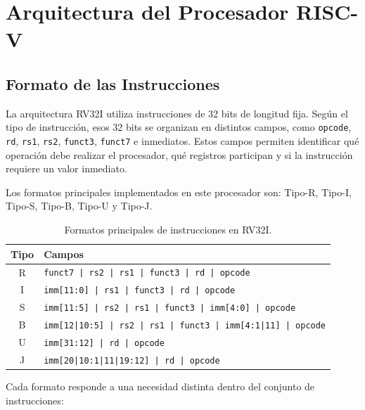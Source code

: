 \section{Arquitectura del Procesador RISC-V}

\subsection{Formato de las Instrucciones}
La arquitectura RV32I utiliza instrucciones de 32 bits de longitud fija. Según el tipo de instrucción, esos 32 bits se organizan en distintos campos, como \texttt{opcode}, \texttt{rd}, \texttt{rs1}, \texttt{rs2}, \texttt{funct3}, \texttt{funct7} e inmediatos. Estos campos permiten identificar qué operación debe realizar el procesador, qué registros participan y si la instrucción requiere un valor inmediato.

Los formatos principales implementados en este procesador son: Tipo-R, Tipo-I, Tipo-S, Tipo-B, Tipo-U y Tipo-J.

\begin{table}[h]
\centering
\begin{tabular}{|c|p{10cm}|}
\hline
\textbf{Tipo} & \textbf{Campos} \\ \hline
R & \texttt{funct7 | rs2 | rs1 | funct3 | rd | opcode} \\ \hline
I & \texttt{imm[11:0] | rs1 | funct3 | rd | opcode} \\ \hline
S & \texttt{imm[11:5] | rs2 | rs1 | funct3 | imm[4:0] | opcode} \\ \hline
B & \texttt{imm[12|10:5] | rs2 | rs1 | funct3 | imm[4:1|11] | opcode} \\ \hline
U & \texttt{imm[31:12] | rd | opcode} \\ \hline
J & \texttt{imm[20|10:1|11|19:12] | rd | opcode} \\ \hline
\end{tabular}
\caption{Formatos principales de instrucciones en RV32I.}
\end{table}

Cada formato responde a una necesidad distinta dentro del conjunto de instrucciones:

